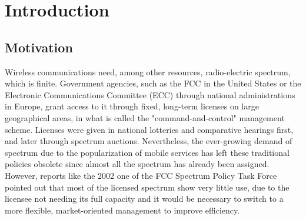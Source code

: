 \graphicspath{ {img/SPEC_MAN/} }
\chapter{Introduction}
\section{Motivation}
Wireless communications need, among other resources, radio-electric spectrum, which is finite. 
Government agencies, such as the FCC in the United States or the Electronic Communications Committee (ECC) through national administrations in Europe, grant access to it through fixed, long-term licenses on large geographical areas, in what is called the "command-and-control" management scheme. 
Licenses were given in national lotteries and comparative hearings first, and later through spectrum auctions.
Nevertheless, the ever-growing demand of spectrum due to the popularization of mobile services has left these traditional policies obsolete since almost all the spectrum has already been assigned. %
However, reports like the 2002 one of the FCC Spectrum Policy Task Force \cite{ref:FCC2002} pointed out that most of the licensed spectrum show very little use, due to the licensee not needing its full capacity and it would be necessary to switch to a more flexible, market-oriented management \cite{ref:Valletti2001} to improve efficiency. %


